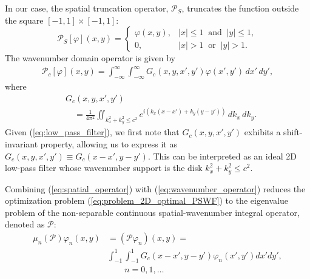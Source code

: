 \documentclass[lettersize,journal]{IEEEtran}
\theoremstyle{plain}
\begin{document}
In our case, the spatial truncation operator, $\mathcal{P}_S$, truncates the function outside the square $[-1, 1] \times [-1, 1]$:
\begin{equation}
	\mathcal{P}_S[\varphi](x, y) = \begin{cases} \varphi(x, y), & \left|x\right| \leq 1 \;\; \text{and} \;\; \left|y\right|  \leq 1, \\ 0, & \left|x\right|  > 1 \;\; \text{or} \;\; \left|y\right| > 1. \end{cases}
	\label{eq:spatial_operator}
\end{equation}
The wavenumber domain operator is given by
\begin{align}
	\mathcal{P}_c[\varphi](x, y) = \int_{-\infty}^{\infty}\int_{-\infty}^{\infty}G_c(x, y, x', y')\varphi(x', y')\,dx'\,dy',
	\label{eq:wavenumber_operator}
\end{align}
where
\begin{align}
	&G_c(x, y, x', y') \nonumber \\
	&\quad = \frac{1}{4\pi^2}\iint_{k_x^2 + k_y^2 \leq c^2}e^{i(k_x(x-x') + k_y(y-y'))}\,dk_x\,dk_y.
	\label{eq:low_pass_filter}
\end{align}
Given (\ref{eq:low_pass_filter}), we first note that $G_c(x, y, x', y')$ exhibits a shift-invariant property, allowing us to express it as $G_c(x, y, x', y') \equiv G_c(x-x', y-y')$. This can be interpreted as an ideal 2D low-pass filter whose wavenumber support is the disk $k_x^2 + k_y^2 \leq c^2$.

Combining (\ref{eq:spatial_operator}) with (\ref{eq:wavenumber_operator}) reduces the optimization problem (\ref{eq:problem_2D_optimal_PSWF}) to the eigenvalue problem of the non-separable continuous spatial-wavenumber integral operator, denoted as $\mathcal{P}$:
\begin{align}
	 \mu_n(\mathcal{P})\varphi_n(x, y)  &= (\mathcal{P}\varphi_n)(x, y) = \nonumber \\ &  \int_{-1}^{1}\int_{-1}^{1}G_c(x-x', y-y')\varphi_n(x', y')dx'dy', \nonumber \\
	& \qquad n = 0, 1, \ldots
	\label{eq:integral_equation}
\end{align}
	
\end{document}
